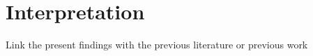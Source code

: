 \chapter{Interpretation} %

\label{ch:Interpretation} %
Link the present findings with the previous literature or previous work